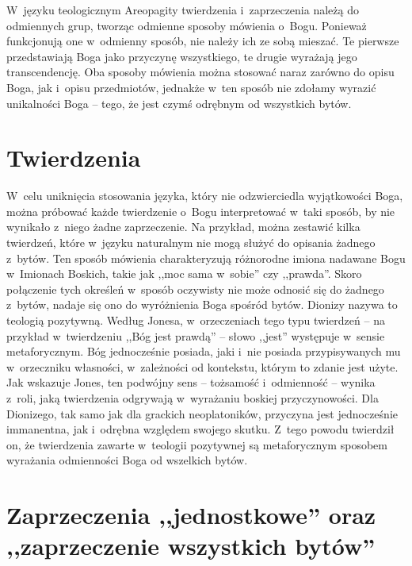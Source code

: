 W~języku teologicznym Areopagity twierdzenia i~zaprzeczenia należą do odmiennych grup, tworząc odmienne sposoby mówienia o~Bogu. Ponieważ funkcjonują one w~odmienny sposób, nie należy ich ze sobą mieszać. Te pierwsze przedstawiają Boga jako przyczynę wszystkiego, te drugie wyrażają jego transcendencję. Oba sposoby mówienia można stosować naraz zarówno do opisu Boga, jak i~opisu przedmiotów, jednakże w~ten sposób nie zdołamy wyrazić unikalności Boga -- tego, że jest czymś odrębnym od wszystkich bytów.


\section{Twierdzenia}

W~celu uniknięcia stosowania języka, który nie odzwierciedla wyjątkowości Boga, można próbować każde twierdzenie o~Bogu interpretować w~taki sposób, by nie wynikało z~niego żadne zaprzeczenie. Na przykład, można zestawić kilka twierdzeń, które w~języku naturalnym nie mogą służyć do opisania żadnego z~bytów. Ten sposób mówienia charakteryzują różnorodne imiona nadawane Bogu w~Imionach Boskich, takie jak ,,moc sama w~sobie'' czy ,,prawda''. Skoro połączenie tych określeń w~sposób oczywisty nie może odnosić się do żadnego z~bytów, nadaje się ono do wyróżnienia Boga spośród bytów. Dionizy nazywa to teologią pozytywną. Według Jonesa, w~orzeczeniach tego typu twierdzeń -- na przykład w~twierdzeniu ,,Bóg jest prawdą'' -- słowo ,,jest'' występuje w~sensie metaforycznym. Bóg jednocześnie posiada, jaki i~nie posiada przypisywanych mu w~orzeczniku własności, w~zależności od kontekstu, którym to zdanie jest użyte. Jak wskazuje Jones, ten podwójny sens -- tożsamość i~odmienność -- wynika z~roli, jaką twierdzenia odgrywają w~wyrażaniu boskiej przyczynowości. Dla Dionizego, tak samo jak dla grackich neoplatoników, przyczyna jest jednocześnie immanentna, jak i~odrębna względem swojego skutku. Z~tego powodu twierdził on, że twierdzenia zawarte w~teologii pozytywnej są metaforycznym sposobem wyrażania odmienności Boga od wszelkich bytów.


\section{Zaprzeczenia ,,jednostkowe'' oraz ,,zaprzeczenie wszystkich bytów''}

